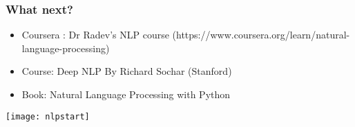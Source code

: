 \begin{frame}[fragile]\frametitle{What next?}
\begin{itemize}
\item Coursera : Dr Radev's NLP course (https://www.coursera.org/learn/natural-language-processing)
\item Course: Deep NLP By Richard Sochar (Stanford)
\item  Book: Natural Language Processing with Python
\end{itemize}
\begin{center}
\texttt{[image: nlpstart]}
\end{center}
\end{frame}